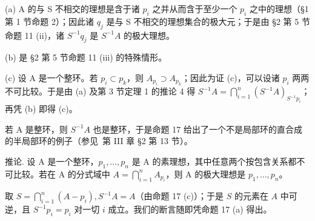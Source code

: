 (a) A 的与 S 不相交的理想是含于诸 \(p_{i}\) 之并从而含于至少一个 \(p_{i}\) 之中的理想（§1 第 1 节命题 2）；因此诸 \(q_{j}\) 是与 S 不相交的理想集合的极大元；于是由 §2 第 5 节命题 11 (ii)，诸 \(S^{-1}q_{j}\) 是 \(S^{-1}A\) 的极大理想。

(b) 是 §2 第 5 节命题 11 (iii) 的特殊情形。

(c) 设 A 是一个整环。若 \(p_{i} \subset p_{k}\)，则 \(A_{p_{i}} \supset A_{p_{k}}\)；因此为证 (c)，可以设诸 \(p_{i}\) 两两不可比较。于是由 (a) 及第 3 节定理 1 的推论 4 得 \(S^{-1}A = \bigcap_{i=1}^{n} (S^{-1}A)_{S^{-1}p_{i}}\)；再凭 (b) 即得 (c)。

若 A 是整环，则 \(S^{-1}A\) 也是整环，于是命题 17 给出了一个不是局部环的直合成的半局部环的例子（参见~第 III 章 §2 第 13 节）。

推论. 设 A 是一个整环，\(p_{1}, \ldots, p_{n}\) 是 A 的素理想，其中任意两个按包含关系都不可比较。若在 A 的分式域中 \(A = \bigcap_{i=1}^{n} A_{p_{i}}\)，则 A 的极大理想是 \(p_{1}, \ldots, p_{n}\)。

取 \(S = \bigcap_{i=1}^{n} (A - p_i), S^{-1} A = A\)（由命题 17 (c)）；于是 \(S\) 的元素在 \(A\) 中可逆，且 \(S^{-1} p_i = p_i\) 对一切 \(i\) 成立。我们的断言随即凭命题 17 (a) 得出。

